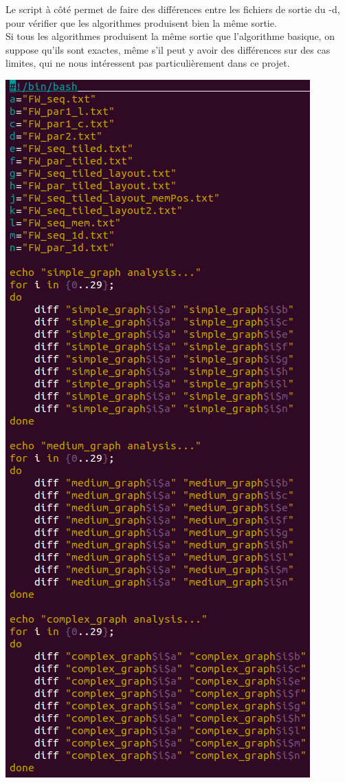 \documentclass[a4paper,11pt]{article}
\begin{document}
\begin{minipage}{0.35\linewidth}
Le script à côté permet de faire des différences entre les fichiers de sortie du -d, pour vérifier que les algorithmes produisent bien la même sortie.\\

Si tous les algorithmes produisent la même sortie que l'algorithme basique, on suppose qu'ils sont exactes, même s'il peut y avoir des différences sur des cas limites, qui ne nous intéressent pas particulièrement dans ce projet.

\end{minipage}\hfill
\begin{minipage}{0.65\linewidth}
  \begin{center}
    \includegraphics[scale=0.55]{diff_script.png}
  \end{center}
\end{minipage}
\end{document}

